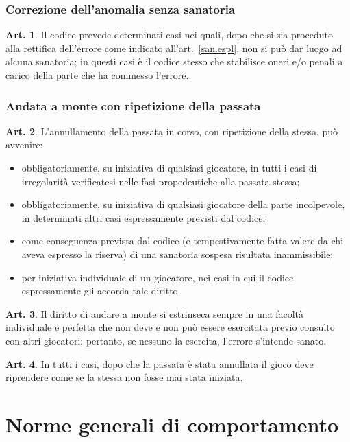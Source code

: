 \documentclass[italian,a4paper]{book}
\theoremstyle{definition}
\newtheorem{art}{Art.}
\newenvironment{packeditem}{
\begin{itemize}
  \setlength{\itemsep}{1pt}
  \setlength{\parskip}{0pt}
  \setlength{\parsep}{0pt}
}{\end{itemize}}
\begin{document}
\subsubsection{Correzione dell'anomalia senza sanatoria}
\begin{art}
    Il codice prevede determinati casi nei quali, dopo che si sia proceduto
    alla rettifica dell'errore come indicato all'art.~\ref{san.espl}, non si può dar luogo ad alcuna sanatoria; in questi casi è il codice stesso che stabilisce oneri e/o penali a carico della parte che ha commesso l'errore.
\end{art}
\subsubsection{Andata a monte con ripetizione della passata}
\begin{art}
    L'annullamento della passata in corso, con ripetizione della stessa, può avvenire:
    \begin{packeditem}
\item      obbligatoriamente, su iniziativa di qualsiasi giocatore, in tutti i casi di irregolarità verificatesi nelle fasi propedeutiche alla passata stessa;
\item      obbligatoriamente, su iniziativa di qualsiasi giocatore della parte incolpevole, in determinati altri casi espressamente previsti dal codice;
\item       come conseguenza prevista dal codice (e tempestivamente fatta valere da chi aveva espresso la riserva) di una sanatoria sospesa risultata inammissibile;
\item      per iniziativa individuale di un giocatore, nei casi in cui il codice espressamente gli accorda tale diritto.
    \end{packeditem}
\end{art}
\begin{art}
    Il diritto di andare a monte si estrinseca sempre in una facoltà individuale e perfetta che non deve e non può essere esercitata previo consulto con altri giocatori; pertanto, se nessuno la esercita, l'errore s'intende sanato.
\end{art}
\begin{art}
    In tutti i casi, dopo che la passata è stata annullata il gioco deve riprendere come se la stessa non fosse mai stata iniziata.
\end{art}
\section{Norme generali di comportamento}
\end{document}
